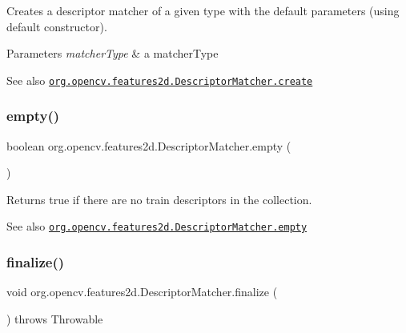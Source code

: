 Creates a descriptor matcher of a given type with the default parameters (using default constructor).


\begin{DoxyParams}{Parameters}
{\em matcher\+Type} & a matcher\+Type\\
\hline
\end{DoxyParams}
\begin{DoxySeeAlso}{See also}
\href{http://docs.opencv.org/modules/features2d/doc/common_interfaces_of_descriptor_matchers.html#descriptormatcher-create}{\tt org.\+opencv.\+features2d.\+Descriptor\+Matcher.\+create} 
\end{DoxySeeAlso}
\mbox{\label{classorg_1_1opencv_1_1features2d_1_1_descriptor_matcher_a95a7d890bb409e13791a4f7702631e59}} 
\subsubsection{\texorpdfstring{empty()}{empty()}}
{\footnotesize\ttfamily boolean org.\+opencv.\+features2d.\+Descriptor\+Matcher.\+empty (\begin{DoxyParamCaption}{ }\end{DoxyParamCaption})}

Returns true if there are no train descriptors in the collection.

\begin{DoxySeeAlso}{See also}
\href{http://docs.opencv.org/modules/features2d/doc/common_interfaces_of_descriptor_matchers.html#descriptormatcher-empty}{\tt org.\+opencv.\+features2d.\+Descriptor\+Matcher.\+empty} 
\end{DoxySeeAlso}
\mbox{\label{classorg_1_1opencv_1_1features2d_1_1_descriptor_matcher_ad785f08a619cbbaf5dcb926fdc12aef6}} 
\subsubsection{\texorpdfstring{finalize()}{finalize()}}
{\footnotesize\ttfamily void org.\+opencv.\+features2d.\+Descriptor\+Matcher.\+finalize (\begin{DoxyParamCaption}{ }\end{DoxyParamCaption}) throws Throwable\hspace{0.3cm}{\ttfamily [protected]}}

